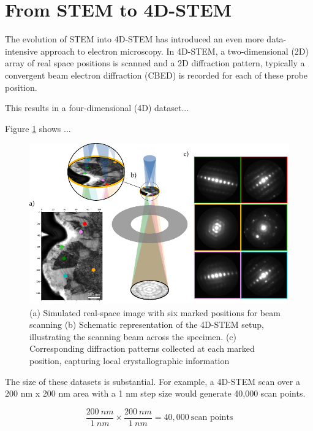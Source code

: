 \section{From STEM to 4D-STEM}

The evolution of STEM into 4D-STEM has introduced an even more data-intensive approach to electron microscopy. 
In 4D-STEM, a two-dimensional (2D) array of real space positions is scanned and a 2D diffraction pattern, typically a convergent beam electron diffraction (CBED) is recorded for each of these probe position.

This results in a four-dimensional (4D) dataset...

Figure \ref{fig:4dstem} shows ...


\begin{figure}[ht]
    \centering
    \includegraphics[width=\textwidth]{Introduction/figures/4DSTEM_Overview.pdf}
    \caption[Overview figure of 4D-STEM setup with corresponding CBED patterns]{(a) Simulated real-space image with six marked positions for beam scanning (b) Schematic representation of the 4D-STEM setup, illustrating the scanning beam across the specimen. (c) Corresponding diffraction patterns collected at each marked position, capturing local crystallographic information}
    \label{fig:4dstem}
\end{figure}

The size of these datasets is substantial. For example, a 4D-STEM scan over a 200 nm x 200 nm area with a 1 nm step size would generate 40,000 scan points. 

\begin{equation}
    \frac{200 \ nm}{1 \ nm} \times \frac{200 \ nm}{1 \ nm} = 40,000 \ \text{scan points}  
\end{equation}

